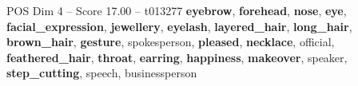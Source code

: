 \begin{textsample}{POS Dim 4 – Score 17.00 – t013277}  \label{ex:f4_pos_034}
\textbf{eyebrow}, \textbf{forehead}, \textbf{nose}, \textbf{eye}, \textbf{facial\_expression}, \textbf{jewellery}, \textbf{eyelash}, \textbf{layered\_hair}, \textbf{long\_hair}, \textbf{brown\_hair}, \textbf{gesture}, spokesperson, \textbf{pleased}, \textbf{necklace}, official, \textbf{feathered\_hair}, \textbf{throat}, \textbf{earring}, \textbf{happiness}, \textbf{makeover}, speaker, \textbf{step\_cutting}, speech, businessperson

\end{textsample}

